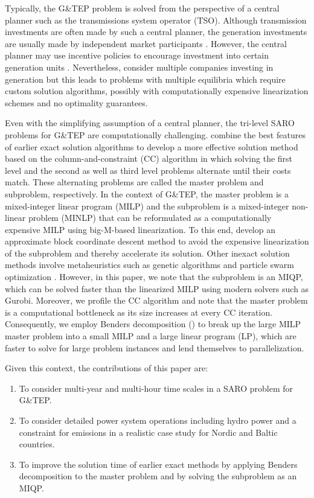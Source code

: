 \documentclass[final]{IEEEtran}
\begin{document}
Typically, the G\&TEP problem is solved from the perspective of a central planner such as the transmissions system operator (TSO). Although transmission investments are often made by such a central planner, the generation investments are usually made by independent market participants \cite{Baringo2018}. However, the central planner may use incentive policies to encourage investment into certain generation units \cite{Zhou, Das}. Nevertheless, \cite{Jin, Roh, Pozo} consider multiple companies investing in generation but this leads to problems with multiple equilibria which require custom solution algorithms, possibly with computationally expensive linearization schemes and no optimality guarantees.

Even with the simplifying assumption of a central planner, the tri-level SARO problems for G\&TEP are computationally challenging. \cite{Minguez} combine the best features of earlier exact solution algorithms to develop a more effective solution method based on the column-and-constraint (CC) algorithm in which solving the first level and the second as well as third level problems alternate until their costs match. These alternating problems are called the master problem and subproblem, respectively. In the context of G\&TEP, the master problem is a mixed-integer linear program (MILP) and the subproblem is a mixed-integer non-linear problem (MINLP) that can be reformulated as a computationally expensive MILP using big-M-based linearization. To this end, \cite{Minguez2018} develop an approximate block coordinate descent method to avoid the expensive linearization of the subproblem and thereby accelerate its solution. Other inexact solution methods involve metaheuristics such as genetic algorithms \cite{Barati} and particle swarm optimization \cite{Hemmati}. However, in this paper, we note that the subproblem is an MIQP, which can be solved faster than the linearized MILP using modern solvers such as Gurobi. Moreover, we profile the CC algorithm and note that the master problem is a computational bottleneck as its size increases at every CC iteration. Consequently, we employ Benders decomposition (\cite{Conejo}) to break up the large MILP master problem into a small MILP and a large linear program (LP), which are faster to solve for large problem instances and lend themselves to parallelization.

Given this context, the contributions of this paper are:
\begin{enumerate}
	\item To consider multi-year and multi-hour time scales in a SARO problem for G\&TEP.
	\item To consider detailed power system operations including hydro power and a constraint for emissions in a realistic case study for Nordic and Baltic countries.
	\item To improve the solution time of earlier exact methods by applying Benders decomposition to the master problem and by solving the subproblem as an MIQP.
\end{enumerate}
\end{document}
